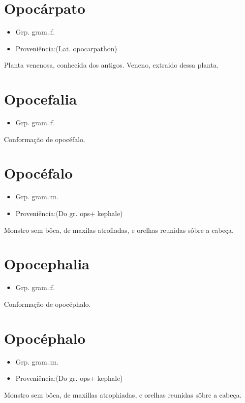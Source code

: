 \section{Opocárpato}
\begin{itemize}
\item {Grp. gram.:f.}
\end{itemize}
\begin{itemize}
\item {Proveniência:(Lat. \textunderscore opocarpathon\textunderscore )}
\end{itemize}
Planta venenosa, conhecida dos antigos.
Veneno, extraido dessa planta.
\section{Opocefalia}
\begin{itemize}
\item {Grp. gram.:f.}
\end{itemize}
Conformação de opocéfalo.
\section{Opocéfalo}
\begin{itemize}
\item {Grp. gram.:m.}
\end{itemize}
\begin{itemize}
\item {Proveniência:(Do gr. \textunderscore ops\textunderscore  + \textunderscore kephale\textunderscore )}
\end{itemize}
Monstro sem bôca, de maxilas atrofiadas, e orelhas reunidas sôbre a cabeça.
\section{Opocephalia}
\begin{itemize}
\item {Grp. gram.:f.}
\end{itemize}
Conformação de opocéphalo.
\section{Opocéphalo}
\begin{itemize}
\item {Grp. gram.:m.}
\end{itemize}
\begin{itemize}
\item {Proveniência:(Do gr. \textunderscore ops\textunderscore  + \textunderscore kephale\textunderscore )}
\end{itemize}
Monstro sem bôca, de maxillas atrophiadas, e orelhas reunidas sôbre a cabeça.
